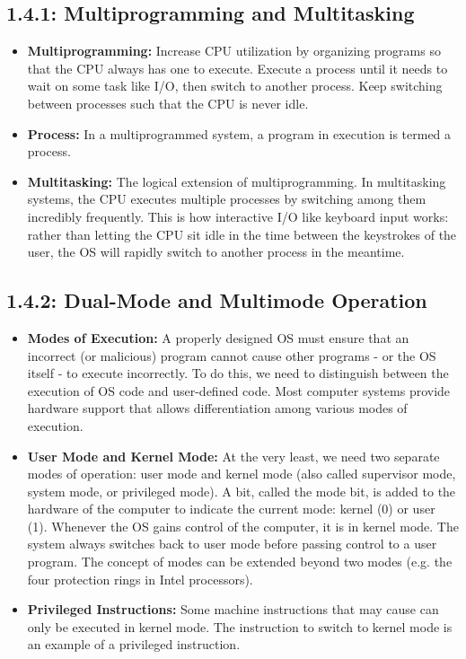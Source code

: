 \documentclass[12pt]{article}
\begin{document}
\subsection*{1.4.1: Multiprogramming and Multitasking}

\begin{itemize}
    \item \textbf{Multiprogramming:} Increase CPU utilization by organizing programs so that the CPU always has one to execute. Execute a process until it needs to wait on some task like I/O, then switch to another process. Keep switching between processes such that the CPU is never idle.
    \item \textbf{Process:} In a multiprogrammed system, a program in execution is termed a process.
    \item \textbf{Multitasking:} The logical extension of multiprogramming. In multitasking systems, the CPU executes multiple processes by switching among them incredibly frequently. This is how interactive I/O like keyboard input works: rather than letting the CPU sit idle in the time between the keystrokes of the user, the OS will rapidly switch to another process in the meantime.
\end{itemize}

\subsection*{1.4.2: Dual-Mode and Multimode Operation}

\begin{itemize}
    \item \textbf{Modes of Execution:} A properly designed OS must ensure that an incorrect (or malicious) program cannot cause other programs - or the OS itself - to execute incorrectly. To do this, we need to distinguish between the execution of OS code and user-defined code. Most computer systems provide hardware support that allows differentiation among various modes of execution.
    \item \textbf{User Mode and Kernel Mode:} At the very least, we need two separate modes of operation: user mode and kernel mode (also called supervisor mode, system mode, or privileged mode). A bit, called the mode bit, is added to the hardware of the computer to indicate the current mode: kernel (0) or user (1). Whenever the OS gains control of the computer, it is in kernel mode. The system always switches back to user mode before passing control to a user program. The concept of modes can be extended beyond two modes (e.g. the four protection rings in Intel processors).
    \item \textbf{Privileged Instructions:} Some machine instructions that may cause can only be executed in kernel mode. The instruction to switch to kernel mode is an example of a privileged instruction.
\end{itemize}
\end{document}
